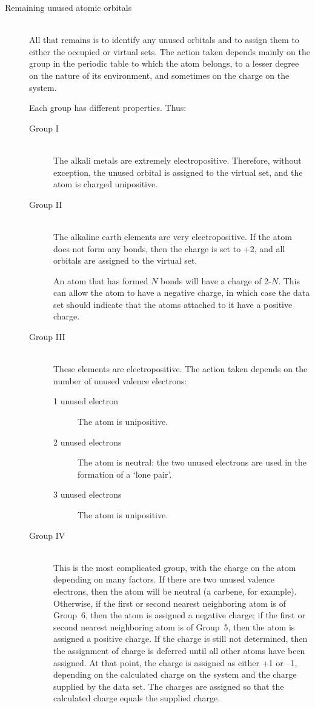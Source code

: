 \begin{description}
\item[Remaining unused atomic orbitals]~\\
All that remains is to identify any unused orbitals and to assign them to
either the occupied or virtual sets.  The action taken depends mainly on
the group in the periodic table to which the atom belongs, to a lesser degree
on the nature of its environment, and sometimes on the charge on the system.

Each group has different properties. Thus:

\begin{description}
\item[Group I]~\\
The alkali metals are extremely electropositive.  Therefore,
without exception, the unused orbital is assigned to the virtual
set, and the atom is charged unipositive.

\item[Group II]~\\
The alkaline earth elements are very electropositive.  If the
atom does not form any bonds, then the charge is set to +2,
and all orbitals are assigned to the virtual set.

An atom that has formed $N$ bonds will have a charge of 2-$N$.
This can allow the atom to have a negative charge, in which case
the data set should indicate that the atoms attached to it have a positive charge.

\item[Group III]~\\
These elements are electropositive.  The action taken depends on the
number of unused valence electrons:
\begin{description}
\item[1 unused electron]  The atom is unipositive.
\item[2 unused electrons]  The atom is neutral:  the two unused electrons
are used in the formation of a `lone pair'.  
\item[3 unused electrons]  The atom is unipositive.
\end{description}

\item[Group IV]~\\
This is the most complicated group, with the charge on the atom depending on
many factors.  If there are two unused valence electrons, then the atom will be
neutral (a carbene, for example). Otherwise, if the first or second nearest
neighboring atom is of Group~6, then the atom is assigned a negative charge; if
the first or second nearest neighboring atom is of Group~5, then the atom is
assigned a positive charge. If the charge is still not determined, then the
assignment of charge is deferred until all other atoms have been assigned.  At
that point, the charge is assigned as either +1 or --1, depending on the
calculated charge on the system and the charge supplied by the data set.  The
charges are assigned so that the calculated charge equals the supplied charge.


\end{description}
\end{description}
